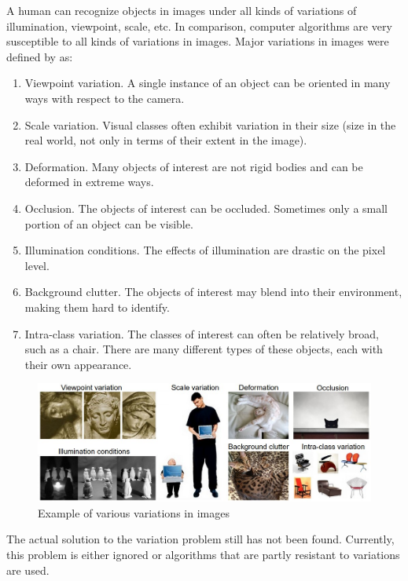 A human can recognize objects in images under all kinds of variations of illumination, viewpoint, scale, etc. In comparison, computer algorithms are very susceptible to all kinds of variations in images. Major variations in images were defined by \cite{231n} as:

\begin{enumerate}
\item Viewpoint variation. A single instance of an object can be oriented in many ways with respect to the camera.
\item Scale variation. Visual classes often exhibit variation in their size (size in the real world, not only in terms of their extent in the image).
\item Deformation. Many objects of interest are not rigid bodies and can be deformed in extreme ways.
\item Occlusion. The objects of interest can be occluded. Sometimes only a small portion of an object can be visible.
\item Illumination conditions. The effects of illumination are drastic on the pixel level.
\item Background clutter. The objects of interest may blend into their environment, making them hard to identify.
\item Intra-class variation. The classes of interest can often be relatively broad, such as a chair. There are many different types of these objects, each with their own appearance.
\end{enumerate}


 \begin{figure}[h]
\centering
\includegraphics[width=14cm]{Figures/2/challenges.jpeg}
\caption{Example of various variations in images \citep{231n}}
\label{fig:imgnet}
\end{figure}

The actual solution to the variation problem still has not been found. Currently, this problem is either ignored or  algorithms that are partly resistant to variations are used.

